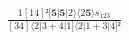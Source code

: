 \documentclass[varwidth, border=5pt]{standalone}
\begin{document}
\begin{my}
$\begin{gathered}
\scriptscriptstyle\frac{1[14]²[𝟓|𝟓|2⟩⟨2𝟓⟩s_{123}}{[34]⟨2|3+4|1]⟨2|1+3|4]²}
\end{gathered}$
\end{my}
\end{document}
